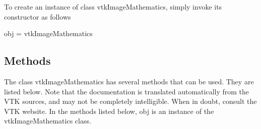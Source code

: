 To create an instance of class vtk\-Image\-Mathematics, simply invoke its constructor as follows \begin{DoxyVerb}  obj = vtkImageMathematics
\end{DoxyVerb}
 \hypertarget{vtkwidgets_vtkxyplotwidget_Methods}{}\subsection{Methods}\label{vtkwidgets_vtkxyplotwidget_Methods}
The class vtk\-Image\-Mathematics has several methods that can be used. They are listed below. Note that the documentation is translated automatically from the V\-T\-K sources, and may not be completely intelligible. When in doubt, consult the V\-T\-K website. In the methods listed below, {\ttfamily obj} is an instance of the vtk\-Image\-Mathematics class. 
